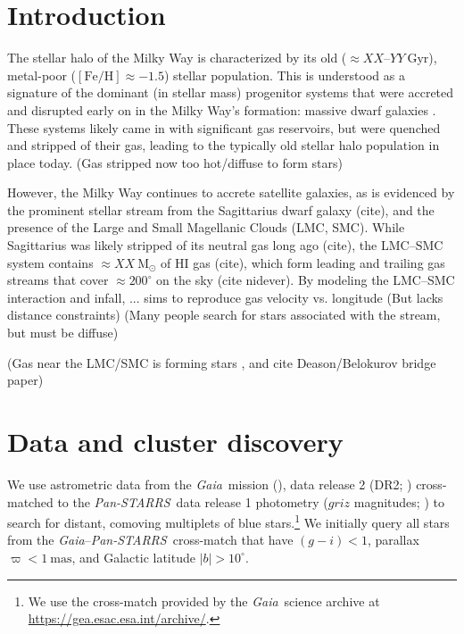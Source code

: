 \documentclass[modern]{aastex62}
\newcommand{\acronym}[1]{{\small{#1}}}
\newcommand{\gaia}{\textsl{Gaia}}
\newcommand{\pans}{\textsl{Pan-STARRS}}
\newcommand{\DR}[1]{\acronym{DR#1}}
\newcommand{\msun}{\textrm{M}_\odot}
\newcommand{\feh}{\ensuremath{[\textrm{Fe} / \textrm{H}]}}
\begin{document}


\section{Introduction} \label{sec:intro}

The stellar halo of the Milky Way is characterized by its old ($\approx XX$--$YY~\textrm{Gyr}$), metal-poor ($\feh \approx -1.5$) stellar population.
This is understood as a signature of the dominant (in stellar mass) progenitor systems that were accreted and disrupted early on in the Milky Way's formation: massive dwarf galaxies \citep[e.g.,][]{Deason:2015, Fiorentino:2015}.
These systems likely came in with significant gas reservoirs, but were quenched and stripped of their gas, leading to the typically old stellar halo population in place today.
(Gas stripped now too hot/diffuse to form stars)

However, the Milky Way continues to accrete satellite galaxies, as is evidenced by the prominent stellar stream from the Sagittarius dwarf galaxy (cite), and the presence of the Large and Small Magellanic Clouds (LMC, SMC).
While Sagittarius was likely stripped of its neutral gas long ago (cite), the LMC--SMC system contains $\approx XX~\msun$ of HI gas (cite), which form leading and trailing gas streams that cover $\approx 200^\circ$ on the sky (cite nidever).
By modeling the LMC--SMC interaction and infall, ... sims to reproduce gas velocity vs. longitude \citep{Besla:2010}
(But lacks distance constraints)
(Many people search for stars associated with the stream, but must be diffuse)

(Gas near the LMC/SMC is forming stars \citep{Casetti-Dinescu2014,MoniBidin2017}, and cite Deason/Belokurov bridge paper)



\section{Data and cluster discovery} \label{sec:data}

We use astrometric data from the \gaia\ mission (\citealt{Prusti:2016}), data release 2 (\DR{2}; \citealt{Gaia-Collaboration:2018, Lindegren:2018}) cross-matched to the \pans\ data release 1 photometry ($griz$ magnitudes; \citealt{Chambers:2016}) to search for distant, comoving multiplets of blue stars.\footnote{We use the cross-match provided by the \gaia\ science archive at \url{https://gea.esac.esa.int/archive/}.}
We initially query all stars from the \gaia--\pans\ cross-match that have $(g - i) < 1$, parallax $\varpi < 1~\textrm{mas}$, and Galactic latitude $|b| > 10^\circ$.
\end{document}
